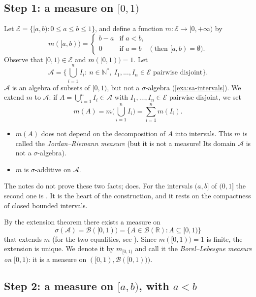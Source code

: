 \subsection*{Step 1: a measure on \texorpdfstring{$[0,1)$}{[0,1)}}

Let $\mathcal E=\{[a,b):0\le a\le b\le 1\}$, and define a function $m:\mathcal
E\to[0,+\infty)$ by
\[
  m([a,b))=\begin{cases} b-a & \text{if } a<b,\\ 0 & \text{if } a=b \quad(\text{then }[a,b)=\emptyset).\end{cases}
\]
Observe that $[0,1)\in\mathcal E$ and $m([0,1))=1$. Let
\[
  \mathcal A=\Big\{\bigcup_{i=1}^n I_i:\ n\in\mathbb N^*,\ I_1,\dots,I_n\in\mathcal E\text{ pairwise disjoint}\Big\}.
\]
$\mathcal A$ is an algebra of subsets of $[0,1)$, but not a $\sigma$-algebra (\cref{exa:sa-intervals}). We extend $m$ to $\mathcal A$: if
$A=\bigcup_{i=1}^nI_i\in\mathcal A$ with $I_1,\dots,I_n\in\mathcal E$ pairwise disjoint, we set
\begin{equation}\label{eq:mf-jordan}
  m(A)=m\Big(\bigcup_{i=1}^nI_i\Big)=\sum_{i=1}^n m(I_i).
\end{equation}
\begin{itemize}
  \item $m(A)$ does not depend on the decomposition of $A$ into intervals. This $m$ is called
    the \emph{Jordan--Riemann measure} (but it is not a measure! Its domain $\mathcal A$ is
    not a $\sigma$-algebra).
  \item $m$ is $\sigma$-additive on $\mathcal A$.
\end{itemize}
The notes do not prove these two facts;  does. For the intervals $(a,b]$
of $(0,1]$ the second one is \citet[Theorem~2.2]{billingsley}. It is the heart of the
construction, and it rests on the compactness of closed bounded intervals.

By the extension theorem there exists a measure on
\[
  \sigma(\mathcal A)=\mathcal B([0,1))=\{A\in\mathcal B(\mathbb R):A\subseteq[0,1)\}
\]
that extends $m$ (for the two equalities, see ). Since $m([0,1))=1$ is
finite, the extension is unique. We denote it by $m_{[0,1)}$ and call it the
\emph{Borel--Lebesgue measure on $[0,1)$}: it is a measure on $([0,1),\mathcal B([0,1)))$.

\subsection*{Step 2: a measure on \texorpdfstring{$[a,b)$}{[a,b)}, with \texorpdfstring{$a<b$}{a<b}}

